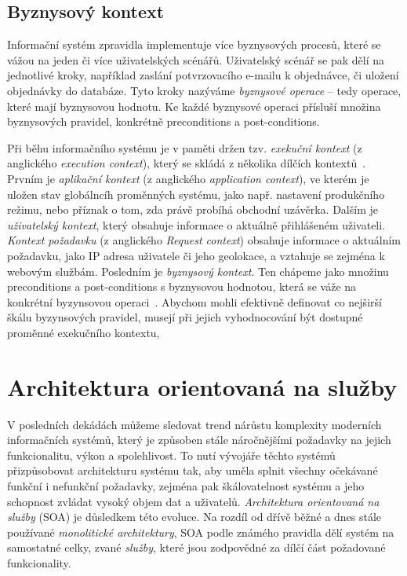 \subsection{Byznysový kontext}

Informační systém zpravidla implementuje více byznysových procesů, které se vážou
na jeden či více uživatelských scénářů. Uživatelský scénář se pak dělí na jednotlivé
kroky, například zaslání potvrzovacího e-mailu k objednávce, či uložení objednávky
do databáze. Tyto kroky nazýváme \textit{byznysové operace} – tedy operace, které mají
byznysovou hodnotu. Ke každé byznysové operaci přísluší množina byznysových pravidel,
konkrétně preconditions a post-conditions.

Při běhu informačního systému je v paměti držen tzv. \textit{exekuční kontext} (z anglického \textit{execution context}),
který se skládá z několika dílčích kontextů~\cite{cemus2017separation}. Prvním
je \textit{aplikační kontext} (z anglického \textit{application context}), ve kterém je uložen stav globálncíh proměnných systému,
jako např. nastavení produkčního režimu, nebo příznak o tom, zda právě probíhá obchodní
uzávěrka. Dalším je \textit{uživatelský kontext}, který obsahuje informace o aktuálně
přihlášeném uživateli. \textit{Kontext požadavku} (z anglického \textit{Request context}) obsahuje
informace o aktuálním požadavku, jako IP adresa uživatele či jeho geolokace,
a vztahuje se zejména k webovým službám. Posledním je \textit{byznysový kontext}. Ten
chápeme jako množinu preconditions a post-conditions s byznysovou hodnotou, která se
váže na konkrétní byzynsovou operaci~\cite{cemus2015automated}.
Abychom mohli efektivně definovat co nejširší škálu byzynsových pravidel,
musejí při jejich vyhodnocování být dostupné proměnné exekučního kontextu,

\section{Architektura orientovaná na služby}

V posledních dekádách můžeme sledovat trend nárůstu komplexity
moderních informačních systémů, který je způsoben stále náročnějšími
požadavky na jejich funkcionalitu, výkon a spolehlivost. To nutí
vývojáře těchto systémů přizpůsobovat architekturu systému tak,
aby uměla splnit všechny očekávané funkční i nefunkční požadavky,
zejména pak škálovatelnost systému a jeho schopnost zvládat vysoký
objem dat a uživatelů. \textit{Architektura orientovaná na služby} (SOA) je
důsledkem této evoluce. Na rozdíl od dřívě běžné a dnes
stále používané \textit{monolitické architektury},
SOA podle známého pravidla 
dělí systém na samostatné celky, zvané \textit{služby}, které jsou
zodpovědné za dílčí část požadované funkcionality.

